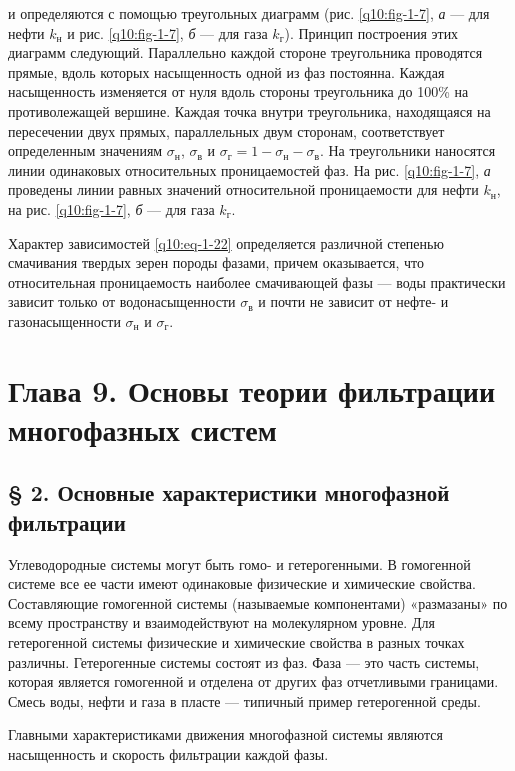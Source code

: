 и определяются с помощью треугольных диаграмм (рис. \ref{q10:fig-1-7}, \textit{а} ---
для нефти $k_\text{н}$ и рис. \ref{q10:fig-1-7}, \textit{б} --- для газа $k_\text{г}$). Принцип построения этих диаграмм следующий. Параллельно каждой стороне треугольника проводятся прямые, вдоль которых насыщенность одной из фаз постоянна. Каждая насыщенность изменяется от нуля вдоль стороны треугольника до 100\% на противолежащей вершине. Каждая точка внутри треугольника, находящаяся на пересечении двух прямых, параллельных двум сторонам, соответствует определенным значениям $\sigma_\text{н}$, $\sigma_\text{в}$ и $\sigma_\text{г}=1-\sigma_\text{н}-\sigma_\text{в}$. На треугольники наносятся линии одинаковых относительных проницаемостей фаз. На рис. \ref{q10:fig-1-7}, \textit{а} проведены линии равных значений относительной проницаемости для нефти $k_\text{н}$, на рис. \ref{q10:fig-1-7}, \textit{б} --- для газа $k_\text{г}$.

Характер зависимостей \eqref{q10:eq-1-22} определяется различной степенью смачивания твердых зерен породы фазами, причем оказывается, что относительная проницаемость наиболее смачивающей фазы --- воды практически зависит только от водонасыщенности $\sigma_\text{в}$ и почти не зависит от нефте- и газонасыщенности $\sigma_\text{н}$ и $\sigma_\text{г}$.

\section*{Глава 9. Основы теории фильтрации многофазных систем}
\subsection*{§ 2. Основные характеристики многофазной фильтрации}
Углеводородные системы могут быть гомо- и гетерогенными. В гомогенной системе все ее части имеют одинаковые физические и химические свойства. Составляющие гомогенной системы (называемые компонентами) «размазаны» по всему пространству и взаимодействуют на молекулярном уровне. Для гетерогенной системы физические и химические свойства в разных точках различны. Гетерогенные системы состоят из фаз. Фаза --- это часть системы, которая является гомогенной и отделена от других фаз отчетливыми границами. Смесь воды, нефти и газа в пласте --- типичный пример гетерогенной среды.

Главными характеристиками движения многофазной системы являются насыщенность и скорость фильтрации каждой фазы.

